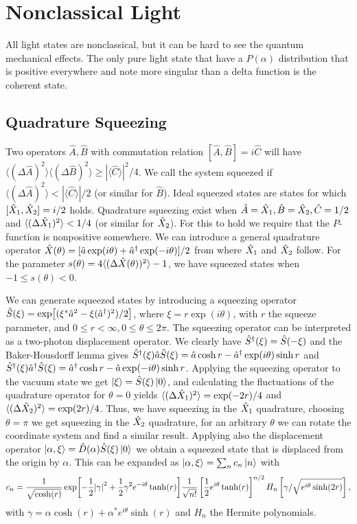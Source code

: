 \section{Nonclassical Light}
All light states are nonclassical, but it can be hard to see the quantum mechanical effects. The only pure light state that have a $P(\alpha)$ distribution that is positive everywhere and note more singular than a delta function is the coherent state.

\subsection{Quadrature Squeezing}
Two operators $\hat{A},\hat{B}$ with commutation relation $[\hat{A},\hat{B}] = i \hat{C}$ will have $\langle (\Delta \hat{A})^2 \rangle\langle (\Delta \hat{B})^2 \rangle \geq |\langle\hat{C}\rangle|^2 /4$. We call the system squeezed if $\langle (\Delta \hat{A})^2 \rangle < |\langle\hat{C}\rangle|/2$ (or similar for $\hat{B}$). Ideal squeezed states are states for which $[\hat{X}_1, \hat{X}_2] = i/2$ holds. Quadrature squeezing exist when $\hat{A} = \hat{X}_1, \hat{B} = \hat{X}_2, \hat{C} = 1/2$ and $\langle (\Delta\hat{X}_1)^2\rangle < 1/4$ (or similar for $\hat{X}_2$). For this to hold we require that the $P$-function is nonpositive somewhere. We can introduce a general quadrature operator $\Xgen(\theta) = [\a\exp(i\theta) + \ad\exp(-i\theta)]/2$ from where $\hat{X}_1$ and $\hat{X}_2$ follow. For the parameter $s(\theta) = 4\langle(\Delta \Xgen(\theta))^2\rangle - 1$, we have squeezed states when $-1 \leq s(\theta) < 0$.

We can generate squeezed states by introducing a squeezing operator $\hat{S}(\xi) = \exp[(\xi^*\hat{a}^2 - \xi (\hat{a}^\dagger)^2)/2]$, where $\xi = r\exp(i\theta)$, with $r$ the squeeze parameter, and $0 \leq r < \infty, 0\leq\theta\leq 2\pi$.  The squeezing operator can be interpreted as a two-photon displacement operator. We clearly have $\hat{S}^\dagger(\xi) = \hat{S}(-\xi)$ and the Baker-Housdorff lemma gives $\Sd(\xi)\a\S(\xi) = \a\cosh r - \ad \exp(i\theta) \sinh r$ and $\Sd(\xi)\ad\S(\xi) = \ad\cosh r - \a \exp(-i\theta) \sinh r$. Applying the squeezing operator to the vacuum state we get $\ket{\xi} = \hat{S}(\xi)\ket{0}$, and calculating the fluctuations of the quadrature operator for $\theta = 0$ yields $\langle (\Delta \hat{X}_1)^2 \rangle = \exp(-2r)/4$ and $\langle (\Delta \hat{X}_2)^2 \rangle = \exp(2r)/4$. Thus, we have squeezing in the $\hat{X}_1$ quadrature, choosing $\theta = \pi$ we get squeezing in the $\hat{X}_2$ quadrature, for an arbitrary $\theta$ we can rotate the coordinate system and find a similar result. Applying also the displacement operator $\ket{\alpha, \xi} = \hat{D}(\alpha)\hat{S}(\xi)\ket{0}$ we obtain a squeezed state that is displaced from the origin by $\alpha$. This can be expanded as $\ket{\alpha, \xi} = \sum_n c_n \ket{n}$ with 
\begin{equation}
    c_n = \frac{1}{\sqrt{\cosh(r)}}\exp[-\frac{1}{2}\abs{\gamma}^2 + \frac{1}{2}\gamma^2 e^{-i\theta}\tanh(r)] \frac{1}{\sqrt{n!}} \left[\frac{1}{2} e^{i\theta}\tanh(r)\right]^{n/2} H_n \left[\gamma /\sqrt{e^{i\theta}\sinh(2r)}\right],\label{eq:cnSqueezedDisplaced}
\end{equation}
with $\gamma = \alpha\cosh(r) + \alpha^*e^{i\theta}\sinh(r)$ and $H_n$ the Hermite polynomials.


